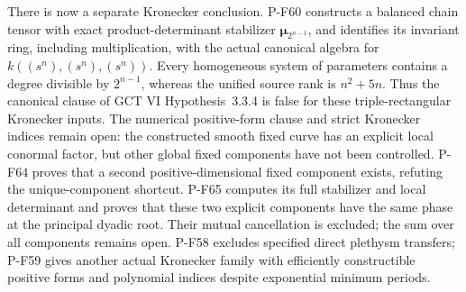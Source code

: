 There is now a separate Kronecker conclusion.  P-F60 constructs a
balanced chain tensor with exact product-determinant stabilizer
$\boldsymbol\mu_{2^{n-1}}$, and identifies its invariant ring,
including multiplication, with the actual canonical algebra for
$k((s^n),(s^n),(s^n))$.  Every homogeneous system of parameters
contains a degree divisible by $2^{n-1}$, whereas the unified source
rank is $n^2+5n$.  Thus the canonical clause of GCT VI
Hypothesis~3.3.4 is false for these triple-rectangular Kronecker
inputs.  The numerical positive-form clause and strict Kronecker
indices remain open: the constructed smooth fixed curve has an
explicit local conormal factor, but other global fixed components
have not been controlled. P-F64 proves that a second positive-dimensional
fixed component exists, refuting the unique-component shortcut.
P-F65 computes its full stabilizer and local determinant and
proves that these two explicit components have the same phase at
the principal dyadic root.  Their mutual cancellation is excluded;
the sum over all components remains open.
P-F58 excludes specified direct
plethysm transfers; P-F59 gives another actual Kronecker family
with efficiently constructible positive forms and polynomial indices
despite exponential minimum periods.


